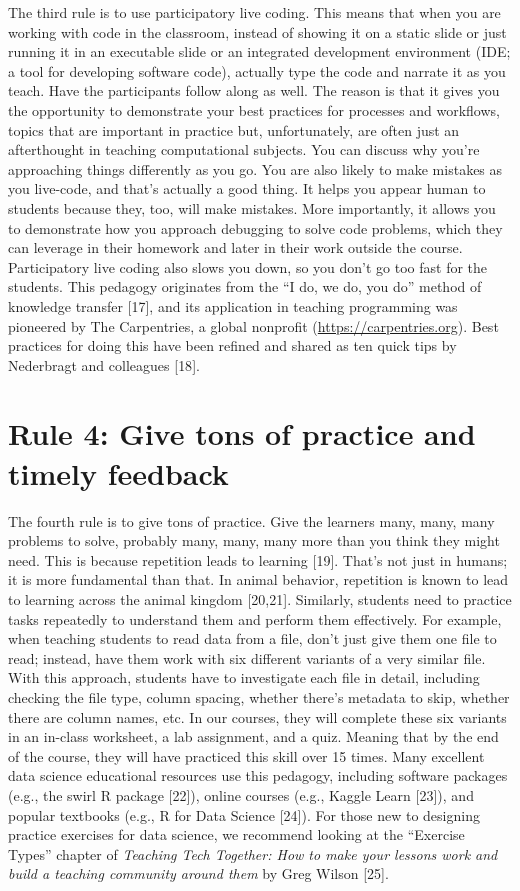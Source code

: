 \documentclass[
  10pt,
  letterpaper,
]{article}
\begin{document}
The third rule is to use participatory live coding. This means that when
you are working with code in the classroom, instead of showing it on a
static slide or just running it in an executable slide or an integrated
development environment (IDE; a tool for developing software code),
actually type the code and narrate it as you teach. Have the
participants follow along as well. The reason is that it gives you the
opportunity to demonstrate your best practices for processes and
workflows, topics that are important in practice but, unfortunately, are
often just an afterthought in teaching computational subjects. You can
discuss why you're approaching things differently as you go. You are
also likely to make mistakes as you live-code, and that's actually a
good thing. It helps you appear human to students because they, too,
will make mistakes. More importantly, it allows you to demonstrate how
you approach debugging to solve code problems, which they can leverage
in their homework and later in their work outside the course.
Participatory live coding also slows you down, so you don't go too fast
for the students. This pedagogy originates from the ``I do, we do, you
do'' method of knowledge transfer {[}17{]}, and its application in
teaching programming was pioneered by The Carpentries, a global
nonprofit (\url{https://carpentries.org}). Best practices for doing this
have been refined and shared as ten quick tips by Nederbragt and
colleagues {[}18{]}.

\section{Rule 4: Give tons of practice and timely
feedback}\label{sec-rule4}

The fourth rule is to give tons of practice. Give the learners many,
many, many problems to solve, probably many, many, many more than you
think they might need. This is because repetition leads to learning
{[}19{]}. That's not just in humans; it is more fundamental than that.
In animal behavior, repetition is known to lead to learning across the
animal kingdom {[}20,21{]}. Similarly, students need to practice tasks
repeatedly to understand them and perform them effectively. For example,
when teaching students to read data from a file, don't just give them
one file to read; instead, have them work with six different variants of
a very similar file. With this approach, students have to investigate
each file in detail, including checking the file type, column spacing,
whether there's metadata to skip, whether there are column names, etc.
In our courses, they will complete these six variants in an in-class
worksheet, a lab assignment, and a quiz. Meaning that by the end of the
course, they will have practiced this skill over 15 times. Many
excellent data science educational resources use this pedagogy,
including software packages (e.g., the swirl R package {[}22{]}), online
courses (e.g., Kaggle Learn {[}23{]}), and popular textbooks (e.g., R
for Data Science {[}24{]}). For those new to designing practice
exercises for data science, we recommend looking at the ``Exercise
Types'' chapter of \emph{Teaching Tech Together: How to make your
lessons work and build a teaching community around them} by Greg Wilson
{[}25{]}.
\end{document}
